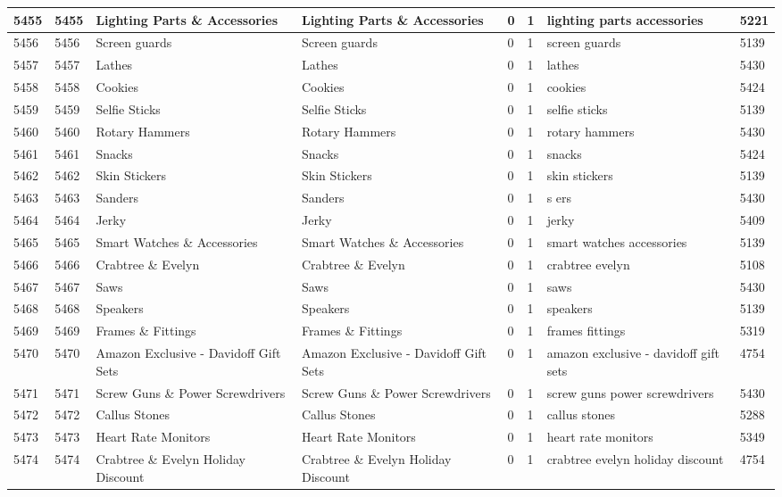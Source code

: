 \begin{longtable}{|l|l|l|l|l|l|l|l|}
5455 & 5455 & Lighting Parts \& Accessories & Lighting Parts \& Accessories & 0 & 1 & lighting parts accessories & 5221 \\ \hline 
5456 & 5456 & Screen guards & Screen guards & 0 & 1 & screen guards & 5139 \\ \hline 
5457 & 5457 & Lathes & Lathes & 0 & 1 & lathes & 5430 \\ \hline 
5458 & 5458 & Cookies & Cookies & 0 & 1 & cookies & 5424 \\ \hline 
5459 & 5459 & Selfie Sticks & Selfie Sticks & 0 & 1 & selfie sticks & 5139 \\ \hline 
5460 & 5460 & Rotary Hammers & Rotary Hammers & 0 & 1 & rotary hammers & 5430 \\ \hline 
5461 & 5461 & Snacks & Snacks & 0 & 1 & snacks & 5424 \\ \hline 
5462 & 5462 & Skin Stickers & Skin Stickers & 0 & 1 & skin stickers & 5139 \\ \hline 
5463 & 5463 & Sanders & Sanders & 0 & 1 & s ers & 5430 \\ \hline 
5464 & 5464 & Jerky & Jerky & 0 & 1 & jerky & 5409 \\ \hline 
5465 & 5465 & Smart Watches \& Accessories & Smart Watches \& Accessories & 0 & 1 & smart watches accessories & 5139 \\ \hline 
5466 & 5466 & Crabtree \& Evelyn & Crabtree \& Evelyn & 0 & 1 & crabtree evelyn & 5108 \\ \hline 
5467 & 5467 & Saws & Saws & 0 & 1 & saws & 5430 \\ \hline 
5468 & 5468 & Speakers & Speakers & 0 & 1 & speakers & 5139 \\ \hline 
5469 & 5469 & Frames \& Fittings & Frames \& Fittings & 0 & 1 & frames fittings & 5319 \\ \hline 
5470 & 5470 & Amazon Exclusive - Davidoff Gift Sets & Amazon Exclusive - Davidoff Gift Sets & 0 & 1 & amazon exclusive - davidoff gift sets & 4754 \\ \hline 
5471 & 5471 & Screw Guns \& Power Screwdrivers & Screw Guns \& Power Screwdrivers & 0 & 1 & screw guns power screwdrivers & 5430 \\ \hline 
5472 & 5472 & Callus Stones & Callus Stones & 0 & 1 & callus stones & 5288 \\ \hline 
5473 & 5473 & Heart Rate Monitors & Heart Rate Monitors & 0 & 1 & heart rate monitors & 5349 \\ \hline 
5474 & 5474 & Crabtree \& Evelyn Holiday Discount & Crabtree \& Evelyn Holiday Discount & 0 & 1 & crabtree evelyn holiday discount & 4754 \\ \hline 

\end{longtable}
